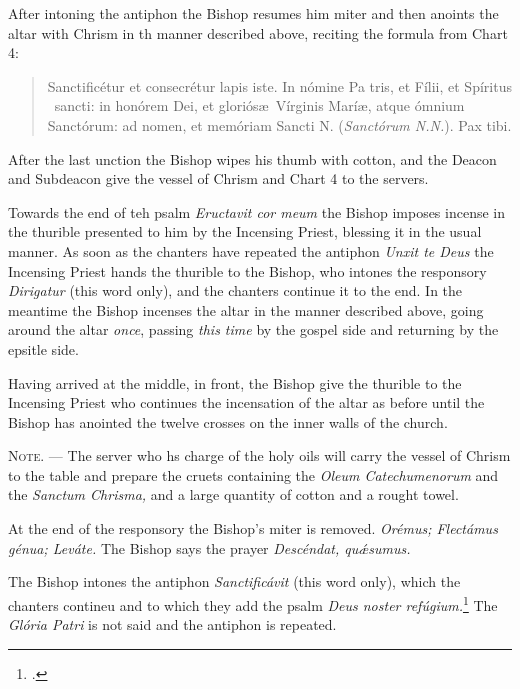\documentclass[letterpaper]{report}
\begin{document}
{After intoning the antiphon the Bishop resumes him miter and then anoints the
altar with Chrism in th manner described above, reciting the formula from Chart
4:

\begin{quote}
    Sancti\cross ficétur et conse\cross crétur lapis iste. In nómine Pa\cross
    tris, et Fí\cross lii, et Spíritus \cross\ sancti: in honórem Dei, et
    gloriós\ae\ Vírginis Marí\ae, atque ómnium Sanctórum: ad nomen, et memóriam
    Sancti N. (\textit{Sanctórum N.N.}). Pax tibi.
\end{quote}

After the last unction the Bishop wipes his thumb with cotton, and the Deacon
and Subdeacon give the vessel of Chrism and Chart 4 to the servers.

\rubric Towards the end of teh psalm \textit{Eructavit cor meum} the Bishop
imposes incense in the thurible presented to him by the Incensing Priest,
blessing it in the usual manner. As soon as the chanters have repeated the
antiphon \textit{Unxit te Deus} the Incensing Priest hands the thurible to the
Bishop, who intones the responsory \textit{Dirigatur} (this word only), and the
chanters continue it to the end. In the meantime the Bishop incenses the altar
in the manner described above, going around the altar \textit{once}, passing
\textit{this time} by the gospel side and returning by the epsitle side.

\rubric Having arrived at the middle, in front, the Bishop give the thurible to
the Incensing Priest who continues the incensation of the altar as before until
the Bishop has anointed the twelve crosses on the inner walls of the church.

\textsc{Note. ---} The server who hs charge of the holy oils will carry the
vessel of Chrism to the table and prepare the cruets containing the
\textit{Oleum Catechumenorum} and the \textit{Sanctum Chrisma,} and a large
quantity of cotton and a rought towel.

\rubric At the end of the responsory the Bishop's miter is removed.
\textit{Orémus; Flectámus génua; Leváte.} The Bishop says the prayer
\textit{Descéndat, qu\'\ae sumus.}

\rubric The Bishop intones the antiphon \textit{Sanctificávit} (this word
only), which the chanters contineu and to which they add the psalm \textit{Deus
noster refúgium.}\footcite[The antiphon \textit{Sanctificávit Dóminus} may be
repeated after each verse of this psalm.][footnote 1, p. 108.]{consecranda} The
\textit{Glória Patri} is not said and the antiphon is repeated.

}
\end{document}
